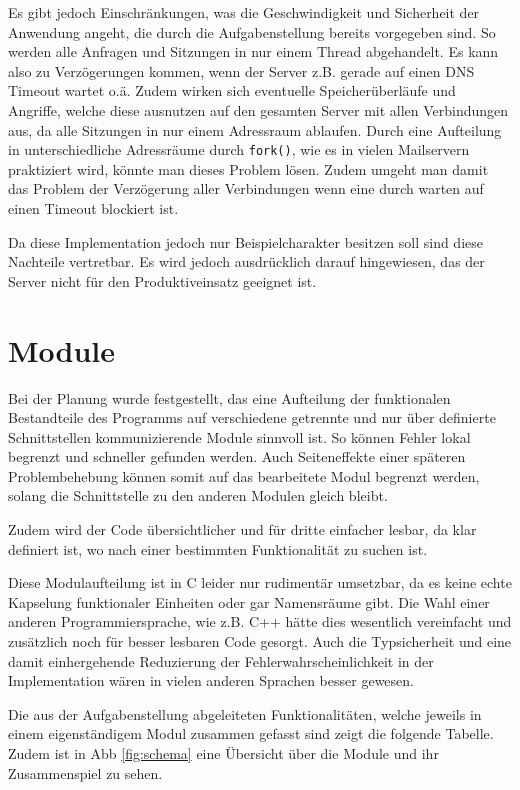 \documentclass[final,a4paper,11pt,notitlepage,halfparskip]{scrreprt}
\begin{document}
Es gibt jedoch Einschränkungen, was die Geschwindigkeit und Sicherheit der 
Anwendung angeht, die durch die Aufgabenstellung bereits vorgegeben sind.
So werden alle Anfragen und Sitzungen in nur einem Thread abgehandelt. Es kann
also zu Verzögerungen kommen, wenn der Server z.B. gerade auf einen DNS 
Timeout wartet o.ä. Zudem wirken sich eventuelle Speicherüberläufe und 
Angriffe, welche diese ausnutzen auf den gesamten Server mit allen 
Verbindungen aus, da alle Sitzungen in nur einem Adressraum ablaufen.
Durch eine Aufteilung in unterschiedliche Adressräume durch \texttt{fork()}, 
wie es in vielen Mailservern praktiziert wird, könnte man dieses Problem lösen.
Zudem umgeht man damit das Problem der Verzögerung aller Verbindungen wenn eine
durch warten auf einen Timeout blockiert ist.

Da diese Implementation jedoch nur Beispielcharakter besitzen soll sind diese
Nachteile vertretbar. Es wird jedoch ausdrücklich darauf hingewiesen, das der
Server nicht für den Produktiveinsatz geeignet ist.


\section{Module}
Bei der Planung wurde festgestellt, das eine Aufteilung der funktionalen
Bestandteile des Programms auf verschiedene getrennte und nur über definierte
Schnittstellen kommunizierende Module sinnvoll ist. So können Fehler lokal
begrenzt und schneller gefunden werden. Auch Seiteneffekte einer späteren 
Problembehebung können somit auf das bearbeitete Modul begrenzt werden, solang
die Schnittstelle zu den anderen Modulen gleich bleibt. 

Zudem wird der Code übersichtlicher und für dritte einfacher lesbar, da klar
definiert ist, wo nach einer bestimmten Funktionalität zu suchen ist.

Diese Modulaufteilung ist in C leider nur rudimentär umsetzbar, da es keine
echte Kapselung funktionaler Einheiten oder gar Namensräume gibt. Die Wahl einer
anderen Programmiersprache, wie z.B. C++ hätte dies wesentlich vereinfacht und
zusätzlich noch für besser lesbaren Code gesorgt. Auch die Typsicherheit und
eine damit einhergehende Reduzierung der Fehlerwahrscheinlichkeit in der
Implementation wären in vielen anderen Sprachen besser gewesen.

Die aus der Aufgabenstellung abgeleiteten Funktionalitäten, welche jeweils in
einem eigenständigem Modul zusammen gefasst sind zeigt die folgende Tabelle.
Zudem ist in Abb \ref{fig:schema} eine Übersicht über die Module und ihr
Zusammenspiel zu sehen.
\end{document}
